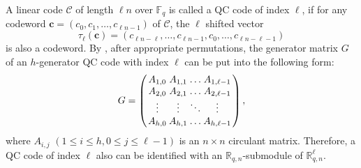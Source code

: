 \documentclass[journal]{IEEEtran}
\begin{document}
A linear code $\mathscr{C}$ of length $\ell n$ over $\mathbb{F}_{q}$ is called a QC code of index $\ell$, if for any codeword $\mathbf{c}=\left(c_{0}, c_{1}, \ldots, c_{\ell n-1}\right)$ of $\mathscr{C}$, the $\ell$ shifted vector  
\[  
\tau_{\ell}(\mathbf{c})=(c_{\ell n-\ell}, \ldots, c_{\ell n-1}, c_0, \ldots, c_{\ell n-\ell-1})  
\]  
is also a codeword.  
By \cite{huffman2021concise}, after appropriate permutations, the generator matrix $G$ of an $h$-generator QC code with index $\ell$ can be put into the following form:
\begin{equation}\setlength{\arraycolsep}{1.2pt}
	G=\left(\begin{array}{cccc}
		A_{1,0} & A_{1,1} & \ldots & A_{1, \ell-1} \\
		A_{2,0} & A_{2,1} & \ldots & A_{2, \ell-1} \\
		\vdots & \vdots & \ddots & \vdots \\
		A_{h, 0} & A_{h, 1} & \ldots & A_{h, \ell-1}
	\end{array}\right),
\end{equation}
where  $A_{i, j}$ $(1\le i \le h, 0\le j \le \ell-1)$ is an $n\times n$ circulant matrix. %
Therefore, a QC code of index $\ell$ also can be identified with an $\mathbb{R}_{q,n}$-submodule of $\mathbb{R}_{q,n}^{\ell}$.

%
%
%
\end{document}

